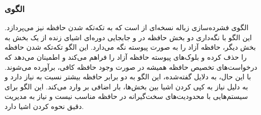 \subsubsection{الگوی }
\label{memGarbCompatorSec}
\begin{RTL}
الگوی فشرده‌سازی زباله \cite{ref4}
نسخه‌ای از 
است که به تکه‌تکه شدن
حافظه نیز می‌پردازد. این الگو با نگه‌داری دو بخش حافظه
در  و جابجایی دوره‌ای اشیای زنده از یک بخش
به بخش دیگر، حافظه آزاد را به صورت پیوسته نگه می‌دارد.
این الگو تکه‌تکه شدن حافظه را حذف کرده و
بلوک‌های پیوسته حافظه آزاد را فراهم می‌کند و
اطمینان می‌دهد که درخواست‌های تخصیص حافظه همیشه در صورت
وجود حافظه کافی، برآورده می‌شوند. با این حال،
به دلایل گفته‌شده، این الگو به دو برابر حافظه بیشتر نسبت
به  نیاز دارد و به دلیل نیاز
به کپی کردن اشیا بین بخش‌ها، بار اضافی بر
 وارد می‌کند. این الگو برای سیستم‌هایی با
محدودیت‌های سخت‌گیرانه در حافظه مناسب نیست و نیاز
به مدیریت دقیق نحوه کردن اشیا دارد.
\end{RTL}